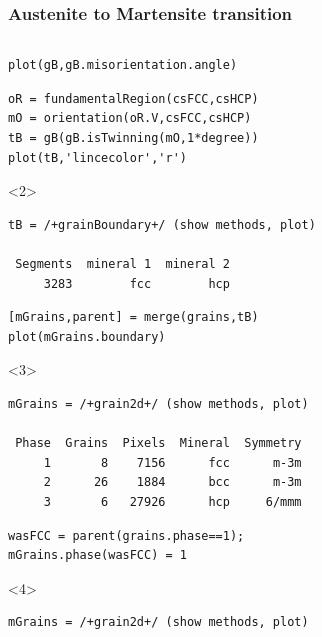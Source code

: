 \documentclass[compress]{beamer}
\begin{document}
\begin{frame}[fragile]
  \frametitle{Austenite to Martensite transition}

  \begin{columns}
    \begin{column}{0.67\textwidth}
      \vspace{-0.5cm}
      \begin{overlayarea}{\textwidth}{\textheight}
      \begin{lstlisting}[style=input]
plot(gB,gB.misorientation.angle)
      \end{lstlisting}

      \pause

      \vspace{-0.1cm}
      \begin{lstlisting}[style=input]
oR = fundamentalRegion(csFCC,csHCP)
mO = orientation(oR.V,csFCC,csHCP)
tB = gB(gB.isTwinning(mO,1*degree))
plot(tB,'lincecolor','r')
      \end{lstlisting}
      \begin{onlyenv}<2>
        \vspace{-0.3cm}
        \begin{lstlisting}[style=output]
tB = /+grainBoundary+/ (show methods, plot)

 Segments  mineral 1  mineral 2
     3283        fcc        hcp
           \end{lstlisting}
        \end{onlyenv}

      \pause

      \vspace{-0.1cm}
      \begin{lstlisting}[style=input]
[mGrains,parent] = merge(grains,tB)
plot(mGrains.boundary)
      \end{lstlisting}
        \begin{onlyenv}<3>
          \vspace{-0.3cm}
          \begin{lstlisting}[style=output]
mGrains = /+grain2d+/ (show methods, plot)

 Phase  Grains  Pixels  Mineral  Symmetry
     1       8    7156      fcc      m-3m
     2      26    1884      bcc      m-3m
     3       6   27926      hcp     6/mmm
           \end{lstlisting}
        \end{onlyenv}

        \pause

          \vspace{-0.1cm}
        \begin{lstlisting}[style=input]
wasFCC = parent(grains.phase==1);
mGrains.phase(wasFCC) = 1
      \end{lstlisting}
        \begin{onlyenv}<4>
          \vspace{-0.3cm}
          \begin{lstlisting}[style=output]
mGrains = /+grain2d+/ (show methods, plot)


\end{lstlisting}
\end{onlyenv}
\end{overlayarea}
\end{column}
\end{columns}
\end{frame}
\end{document}
